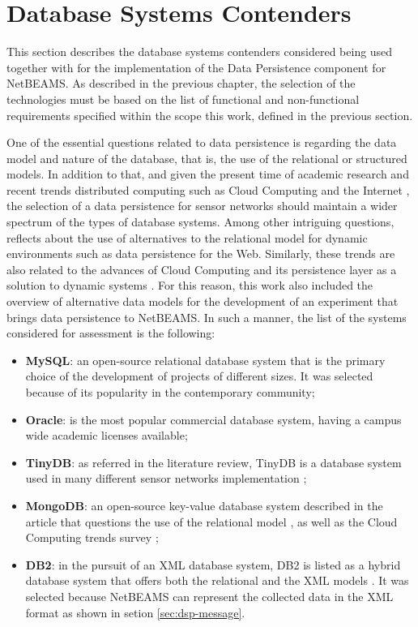 \section{Database Systems Contenders}

This section describes the database systems contenders considered being used
together with for the implementation of the Data Persistence component for 
NetBEAMS. As described in the previous chapter, the selection of the
technologies must be based on the list of functional and non-functional
requirements specified within the scope this work, defined in the previous
section.

One of the essential questions related to data persistence is regarding the
data model and nature of the database, that is, the use of the relational or
structured models. In addition to that, and given the present time of academic
research and recent trends distributed computing such as Cloud Computing and
the Internet \cite{cloud-comp-survey}, the selection of a data persistence for
sensor networks should maintain a wider spectrum of the types of database 
systems. Among other intriguing questions, \cite{db-is-rdbs-dommed} reflects
about the use of alternatives to the relational model for dynamic environments
such as data persistence for the Web. Similarly, these trends are also related
to the advances of Cloud Computing and its persistence layer as a solution to
dynamic systems \cite{cloud-comp-architectures}. For this reason, this work
also included the overview of alternative data models for the development of
an experiment that brings data persistence to NetBEAMS. In such a manner, the
list of the systems considered for assessment is the following:

\begin{itemize}
  \item \textbf{MySQL}\cite{mysql}: an open-source relational database system
  that is the primary choice of the development of projects of different sizes.
  It was selected because of its popularity in the contemporary community;
  \item \textbf{Oracle}\cite{oracle}: is the most popular commercial database
  system, having a campus wide academic licenses available;
  \item \textbf{TinyDB}\cite{tinydb}: as referred in the literature review,
  TinyDB is a database system used in many different sensor networks
  implementation \cite{sn-db-tinydb};
  \item \textbf{MongoDB}\cite{mongodb}: an open-source key-value database
  system described in the article that questions the use of the relational
  model \cite{db-is-rdbs-dommed}, as well as the Cloud Computing trends survey
  \cite{cloud-comp-architectures};
  \item \textbf{DB2}\cite{db2}: in the pursuit of an XML database system, DB2
  is listed as a hybrid database system that offers both the relational and the
  XML models \cite{db-xml-enabled}. It was selected because NetBEAMS can
  represent the collected data in the XML format as shown in setion 
  \ref{sec:dsp-message}.
\end{itemize}

